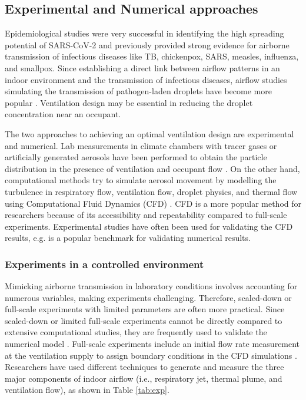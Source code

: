\documentclass[a4paper,12pt]{elsarticle}
\begin{document}
\subsection{Experimental and Numerical approaches}

Epidemiological studies were very successful in identifying the high spreading potential of SARS-CoV-2 \cite{rothan2020epidemiology} and previously provided strong evidence for airborne transmission of infectious diseases like TB, chickenpox, SARS, measles, influenza, and smallpox. Since establishing a direct link between airflow patterns in an indoor environment and the transmission of infectious diseases, airflow studies simulating the transmission of pathogen-laden droplets have become more popular \cite{li2007role}. Ventilation design may be essential in reducing the droplet concentration near an occupant. 

The two approaches to achieving an optimal ventilation design are experimental and numerical. Lab measurements in climate chambers with tracer gases or artificially generated aerosols have been performed to obtain the particle distribution in the presence of ventilation and occupant flow \cite{zhou2021experimental}. On the other hand, computational methods try to simulate aerosol movement by modelling the turbulence in respiratory flow, ventilation flow, droplet physics, and thermal flow using Computational Fluid Dynamics (CFD) \cite{wang2022evaluation}. CFD is a more popular method for researchers because of its accessibility and repeatability compared to full-scale experiments. Experimental studies have often been used for validating the CFD results, e.g. \cite{yin2009experimental} is a popular benchmark for validating numerical results.

\subsubsection{Experiments in a controlled environment}

Mimicking airborne transmission in laboratory conditions involves accounting for numerous variables, making experiments challenging. Therefore, scaled-down \cite{poussou2010flow} or full-scale experiments with limited parameters \cite{luo2022role} are often more practical. Since scaled-down or limited full-scale experiments cannot be directly compared to extensive computational studies, they are frequently used to validate the numerical model \cite{li2020investigating,qin2023transmission,cortellessa2023effectiveness}. Full-scale experiments include an initial flow rate measurement at the ventilation supply to assign boundary conditions in the CFD simulations \cite{romano2015numerical}. Researchers have used different techniques to generate and measure the three major components of indoor airflow (i.e., respiratory jet, thermal plume, and ventilation flow), as shown in Table \ref{tab:exp}.
\end{document}
